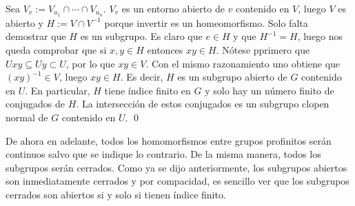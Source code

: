 \documentclass[a4paper,12pt, leqno]{report}
\begin{document}
\begin{dem}
Sea $V_v := V_{u_1}\cap \cdots \cap V_{u_n}$. $V_v$ es un entorno abierto de $v$ contenido en $V$, luego $V$ es abierto y $H:= V \cap V^{-1}$ porque invertir es un homeomorfismo. Solo falta demostrar que $H$ es un subgrupo. Es claro que $e \in H$ y que $H^{-1}=H$, luego nos queda comprobar que si $x,y \in H$ entonces $xy \in H$. Nótese pprimero que $Uxy \subseteq Uy \subset U$, por lo que $xy \in V$. Con el mismo razonamiento uno obtiene que $(xy)^{-1}\in V$, luego $xy \in H$. Es decir, $H$ es un subgrupo abierto de $G$ contenido en $U$. En particular, $H$ tiene índice finito en $G$ y solo hay un número finito de conjugados de $H$. La intersección de estos conjugados es un subgrupo clopen normal de $G$ contenido en $U$. \qed
\end{dem}

De ahora en adelante, todos los homomorfismos entre grupos profinitos serán continuos salvo que se indique lo contrario. De la misma manera, todos los subgrupos serán cerrados. Como ya se dijo anteriormente, los subgrupos abiertos son inmediatamente cerrados y por compacidad, es sencillo ver que los subgrupos cerrados son abiertos si y solo si tienen índice finito. 
\end{document}

